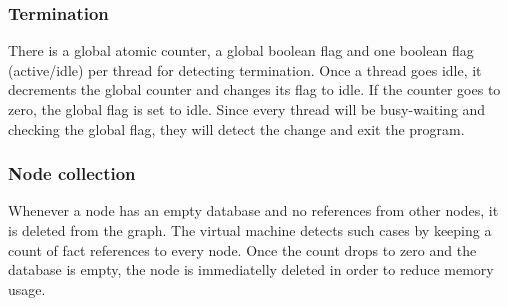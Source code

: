 \subsubsection{Termination}

There is a global atomic counter, a global boolean flag and one boolean flag
(active/idle) per thread for detecting termination. Once a thread goes idle,
it decrements the global counter and changes its flag to idle. If the counter
goes to zero, the global flag is set to idle. Since every thread will be
busy-waiting and checking the global flag, they will detect the change and exit
the program.

\subsubsection{Node collection}

Whenever a node has an empty database and no references from other nodes, it is
deleted from the graph. The virtual machine detects such cases by keeping a
count of fact references to every node. Once the count drops to zero and the
database is empty, the node is immediatelly deleted in order to reduce memory
usage.
